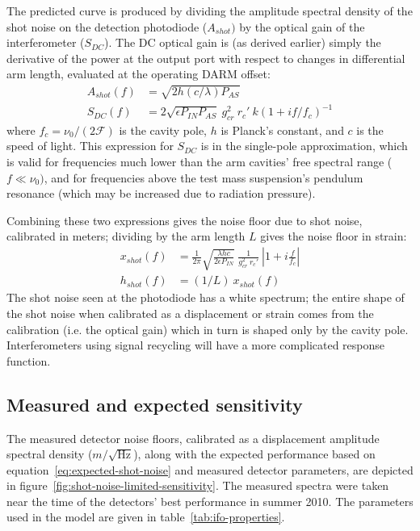 The predicted curve is produced by dividing the amplitude spectral density of
the shot noise on the detection photodiode ($A_{shot})$ by the optical gain of
the interferometer ($S_{DC}$). The DC optical gain is (as derived earlier) simply
the derivative of the power at the output port with respect to changes in
differential arm length, evaluated at the operating DARM offset:
%
\begin{align}
A_{shot}(f) &= \sqrt{2 h (c/\lambda) P_{AS}} \\
S_{DC}(f) &= 2 \sqrt{\epsilon P_{IN} P_{AS}}\ g_{cr}^2\ r_c'\ k\left(1 + i f/f_c\right)^{-1}
\end{align}
%
where $f_c = \nu_0 / (2\mathcal{F})$ is the cavity pole, $h$ is Planck's
constant, and $c$ is the speed of light.  This expression for $S_{DC}$ is in the single-pole
approximation, which is valid for frequencies much lower than the arm cavities'
free spectral range ($f\ll \nu_0)$, and for frequencies above the test mass
suspension's pendulum resonance (which may be increased due to radiation
pressure).

Combining these two expressions gives the noise floor due to shot noise,
calibrated in meters; dividing by the arm length $L$ gives the noise floor in strain:
%
\begin{align}
x_{shot}(f) & = \frac{1}{2\pi} \sqrt{\frac{\lambda h c}{2 \epsilon P_{IN}}}\ \frac{1}{g_{cr}^2\ r_c'}
\ \left|1 + i \frac{f}{f_c}\right| \\
h_{shot}(f) &= (1/L)\ x_{shot}(f)
\label{eq:expected-shot-noise}
\end{align}
%
The shot noise seen at the photodiode has a white spectrum; the entire shape of
the shot noise when calibrated as a displacement or strain comes from the
calibration (i.e. the optical gain) which in turn is shaped only by the cavity
pole.  Interferometers using signal recycling will have a more complicated
response function.

\subsection{Measured and expected sensitivity}
The measured detector noise floors, calibrated as a displacement amplitude
spectral density ($m/\sqrt{\text{Hz}}$), along with the expected performance
based on equation~\ref{eq:expected-shot-noise} and measured detector parameters,
are depicted in figure~\ref{fig:shot-noise-limited-sensitivity}.  The measured
spectra were taken near the time of the detectors' best performance in
summer 2010.  The parameters used in the model are given in
table~\ref{tab:ifo-properties}.  

